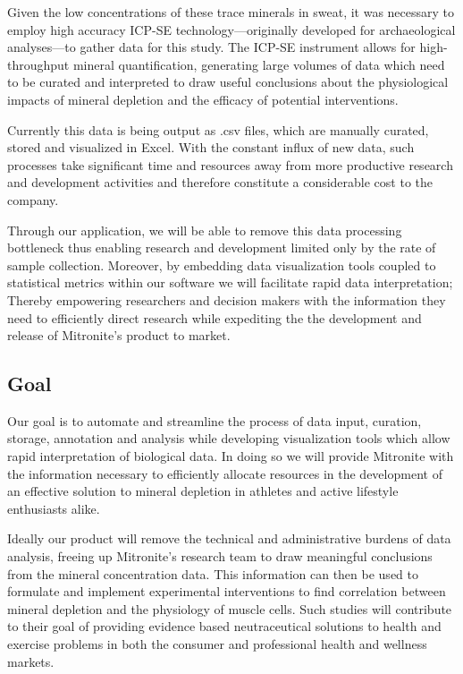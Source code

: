 \documentclass[10pt,twocolumn,letterpaper]{article}
\begin{document}
            Given the low concentrations of these trace minerals in sweat, it was necessary to employ high accuracy ICP-SE technology---originally developed for archaeological analyses---to gather data for this study. The ICP-SE instrument allows for high-throughput mineral quantification, generating large volumes of data which need to be curated and interpreted to draw useful conclusions about the physiological impacts of mineral depletion and the efficacy of potential interventions.

            Currently this data is being output as .csv files, which are manually curated, stored and visualized in Excel. With the constant influx of new data, such processes take significant time and resources away from more productive research and development activities and therefore constitute a considerable cost to the company.

            Through our application, we will be able to remove this data processing bottleneck thus enabling research and development limited only by the rate of sample collection. Moreover, by embedding data visualization tools coupled to statistical metrics within our software we will facilitate rapid data interpretation; Thereby empowering researchers and decision makers with the information they need to efficiently direct research while expediting the the development and release of Mitronite's product to market.

            \subsection{Goal}

            Our goal is to automate and streamline the process of data input, curation, storage, annotation and analysis while developing visualization tools which allow rapid interpretation of biological data. In doing so we will provide Mitronite with the information necessary to efficiently allocate resources in the development of an effective solution to mineral depletion in athletes and active lifestyle enthusiasts alike.

            Ideally our product will remove the technical and administrative burdens of data analysis, freeing up Mitronite's research team to draw meaningful conclusions from the mineral concentration data. This information can then be used to formulate and implement experimental interventions to find correlation between mineral depletion and the physiology of muscle cells. Such studies will contribute to their goal of providing evidence based neutraceutical solutions to health and exercise problems in both the consumer and professional health and wellness markets.
\end{document}
